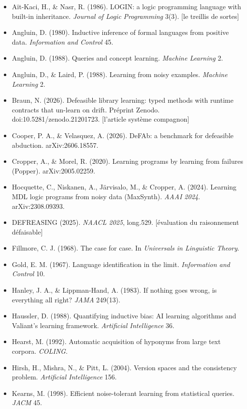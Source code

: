 \documentclass[11pt]{article}
\begin{document}
\begin{itemize}
\item Aït-Kaci, H., \& Nasr, R. (1986). LOGIN: a logic programming language with built-in inheritance. \emph{Journal of Logic Programming} 3(3). [le treillis de sortes]
\item Angluin, D. (1980). Inductive inference of formal languages from positive data. \emph{Information and Control} 45.
\item Angluin, D. (1988). Queries and concept learning. \emph{Machine Learning} 2.
\item Angluin, D., \& Laird, P. (1988). Learning from noisy examples. \emph{Machine Learning} 2.
\item Braun, N. (2026). Defeasible library learning: typed methods with runtime contracts that un-learn on drift. Préprint Zenodo. doi:10.5281/zenodo.21201723. [l'article système compagnon]
\item Cooper, P. A., \& Velasquez, A. (2026). DeFAb: a benchmark for defeasible abduction. arXiv:2606.18557.
\item Cropper, A., \& Morel, R. (2020). Learning programs by learning from failures (Popper). arXiv:2005.02259.
\item Hocquette, C., Niskanen, A., Järvisalo, M., \& Cropper, A. (2024). Learning MDL logic programs from noisy data (MaxSynth). \emph{AAAI 2024}. arXiv:2308.09393.
\item DEFREASING (2025). \emph{NAACL 2025}, long.529. [évaluation du raisonnement défaisable]
\item Fillmore, C. J. (1968). The case for case. In \emph{Universals in Linguistic Theory}.
\item Gold, E. M. (1967). Language identification in the limit. \emph{Information and Control} 10.
\item Hanley, J. A., \& Lippman-Hand, A. (1983). If nothing goes wrong, is everything all right? \emph{JAMA} 249(13).
\item Haussler, D. (1988). Quantifying inductive bias: AI learning algorithms and Valiant's learning framework. \emph{Artificial Intelligence} 36.
\item Hearst, M. (1992). Automatic acquisition of hyponyms from large text corpora. \emph{COLING}.
\item Hirsh, H., Mishra, N., \& Pitt, L. (2004). Version spaces and the consistency problem. \emph{Artificial Intelligence} 156.
\item Kearns, M. (1998). Efficient noise-tolerant learning from statistical queries. \emph{JACM} 45.

\end{itemize}
\end{document}
